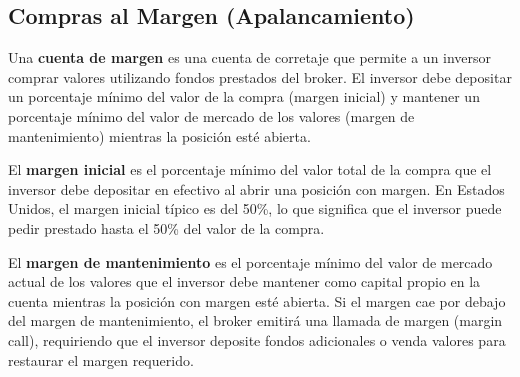 \subsection{Compras al Margen (Apalancamiento)}

\begin{definicion}
Una \textbf{cuenta de margen} es una cuenta de corretaje que permite a un inversor comprar valores utilizando fondos prestados del broker. El inversor debe depositar un porcentaje mínimo del valor de la compra (margen inicial) y mantener un porcentaje mínimo del valor de mercado de los valores (margen de mantenimiento) mientras la posición esté abierta.
\end{definicion}

\begin{definicion}
El \textbf{margen inicial} es el porcentaje mínimo del valor total de la compra que el inversor debe depositar en efectivo al abrir una posición con margen. En Estados Unidos, el margen inicial típico es del 50\%, lo que significa que el inversor puede pedir prestado hasta el 50\% del valor de la compra.
\end{definicion}

\begin{definicion}
El \textbf{margen de mantenimiento} es el porcentaje mínimo del valor de mercado actual de los valores que el inversor debe mantener como capital propio en la cuenta mientras la posición con margen esté abierta. Si el margen cae por debajo del margen de mantenimiento, el broker emitirá una llamada de margen (margin call), requiriendo que el inversor deposite fondos adicionales o venda valores para restaurar el margen requerido.
\end{definicion}

